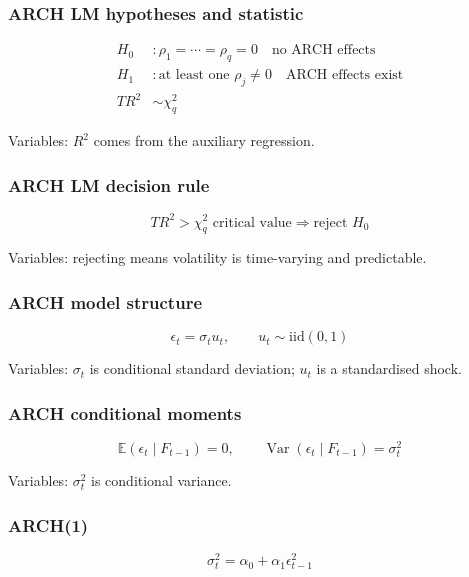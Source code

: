 \documentclass[
  8pt,
  twocolumn]{extarticle}
\begin{document}
\subsubsection{ARCH LM hypotheses and
statistic}\label{arch-lm-hypotheses-and-statistic}

\[
\begin{aligned}
H_0&:\rho_1=\cdots=\rho_q=0\quad \text{no ARCH effects}\\
H_1&:\text{at least one }\rho_j\ne0\quad \text{ARCH effects exist}\\
TR^2&\sim\chi_q^2
\end{aligned}
\]

Variables: \(R^2\) comes from the auxiliary regression.

\subsubsection{ARCH LM decision rule}\label{arch-lm-decision-rule}

\[
TR^2>\chi_q^2\text{ critical value}\Rightarrow \text{reject }H_0
\]

Variables: rejecting means volatility is time-varying and predictable.

\subsubsection{ARCH model structure}\label{arch-model-structure}

\[
\epsilon_t=\sigma_tu_t,\qquad u_t\sim\mathrm{iid}(0,1)
\]

Variables: \(\sigma_t\) is conditional standard deviation; \(u_t\) is a
standardised shock.

\subsubsection{ARCH conditional moments}\label{arch-conditional-moments}

\[
\mathbb E(\epsilon_t\mid F_{t-1})=0,\qquad \operatorname{Var}(\epsilon_t\mid F_{t-1})=\sigma_t^2
\]

Variables: \(\sigma_t^2\) is conditional variance.

\subsubsection{ARCH(1)}\label{arch1}

\[
\sigma_t^2=\alpha_0+\alpha_1\epsilon_{t-1}^2
\]
\end{document}
